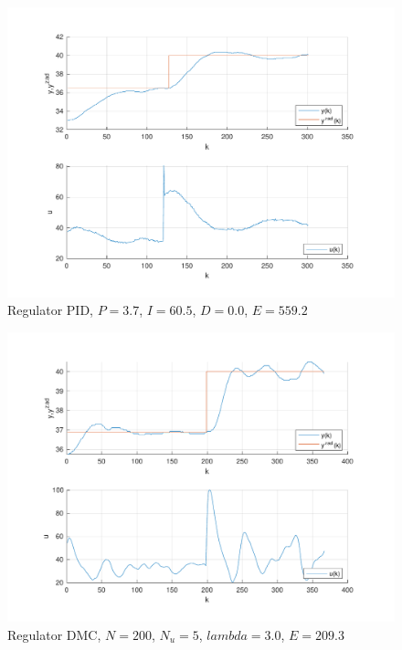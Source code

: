 \begin{figure}[H]
    \centering
    \includegraphics[scale=0.75]{../lab/zad_4/zad4pidd2.pdf}
    \caption{Regulator PID, $P=\num{3.7}$, $I=\num{60.5}$, $D=\num{0.0}$, $E=\num{559.2}$}
\end{figure}


\begin{figure}[H]
    \centering
    \includegraphics[scale=0.75]{../lab/zad_4/zad4dmc1.pdf}
    \caption{Regulator DMC, $N=\num{200}$, $N_{u}=\num{5}$, $lambda=\num{3.0}$, $E=\num{209.3}$}
\end{figure}

